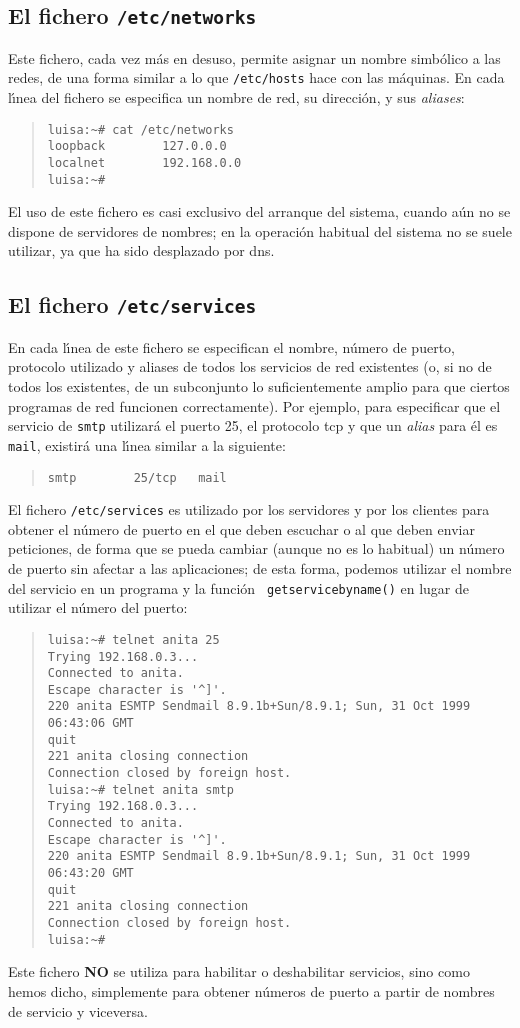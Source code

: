 \subsection{El fichero {\tt /etc/networks}}
Este fichero, cada vez m\'as en desuso, permite asignar un nombre simb\'olico
a las redes, de una forma similar a lo que {\tt /etc/hosts} hace con las
m\'aquinas. En cada l\'{\i}nea del fichero se especifica un nombre de red, su
direcci\'on, y sus {\it aliases}:
\begin{quote}
\begin{verbatim}
luisa:~# cat /etc/networks
loopback        127.0.0.0
localnet        192.168.0.0
luisa:~#
\end{verbatim}
\end{quote}
El uso de este fichero es casi exclusivo del arranque del sistema, cuando a\'un
no se dispone de servidores de nombres; en la operaci\'on habitual del sistema
no se suele utilizar, ya que ha sido desplazado por {\sc dns}.
\subsection{El fichero {\tt /etc/services}}
En cada l\'{\i}nea de este fichero se especifican el nombre, n\'umero de puerto,
protocolo utilizado y aliases de todos los servicios de red existentes (o, si
no de todos los existentes, de un subconjunto lo suficientemente amplio para que
ciertos programas de red funcionen correctamente). Por ejemplo, para especificar
que el servicio de {\tt smtp} utilizar\'a el puerto 25, el protocolo {\sc
tcp} y que un {\it alias} para \'el es {\tt mail}, existir\'a una l\'{\i}nea 
similar a la siguiente:
\tt
\begin{quote}
\begin{verbatim}
smtp        25/tcp   mail
\end{verbatim}
\end{quote}
\rm
El fichero {\tt /etc/services} es utilizado por los servidores y por los 
clientes para obtener el n\'umero de puerto en el que deben escuchar o al que
deben enviar peticiones, de forma que se pueda cambiar (aunque no es lo 
habitual) un n\'umero de puerto sin afectar a las aplicaciones; de esta forma,
podemos utilizar el nombre del servicio en un programa y la funci\'on {\tt
getservicebyname()} en lugar de utilizar el n\'umero del puerto:
\begin{quote}
\begin{verbatim}
luisa:~# telnet anita 25
Trying 192.168.0.3...
Connected to anita.
Escape character is '^]'.
220 anita ESMTP Sendmail 8.9.1b+Sun/8.9.1; Sun, 31 Oct 1999 06:43:06 GMT
quit
221 anita closing connection
Connection closed by foreign host.
luisa:~# telnet anita smtp
Trying 192.168.0.3...
Connected to anita.
Escape character is '^]'.
220 anita ESMTP Sendmail 8.9.1b+Sun/8.9.1; Sun, 31 Oct 1999 06:43:20 GMT
quit
221 anita closing connection
Connection closed by foreign host.
luisa:~#
\end{verbatim}
\end{quote}
Este fichero {\bf NO} se utiliza para habilitar o deshabilitar servicios, sino 
como hemos dicho, simplemente para obtener n\'umeros de puerto a partir de 
nombres de servicio y viceversa.
